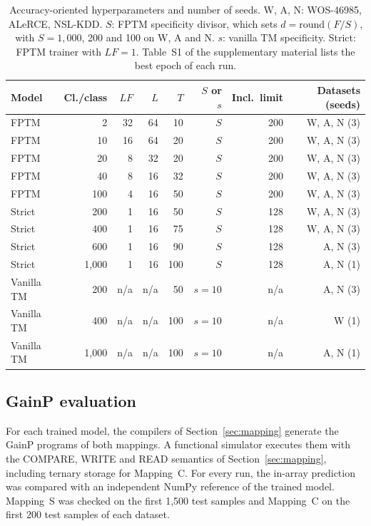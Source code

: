 \documentclass[preprint,review,12pt]{elsarticle}
\newcommand{\gainp}{GainP}
\newcommand{\LF}{\mathit{LF}}
\newcommand{\wosnew}[1]{#1}   %
\begin{document}
\begin{table}[!htbp]
\footnotesize
\setlength{\tabcolsep}{4pt}
\centering
\caption{\wosnew{Accuracy-oriented hyperparameters and number of seeds. W, A, N: WOS-46985, ALeRCE, NSL-KDD. $S$: FPTM specificity divisor, which sets $d=\mathrm{round}(F/S)$, with $S=1{,}000$, 200 and 100 on W, A and N. $s$: vanilla TM specificity. Strict: FPTM trainer with $\LF=1$. Table~S1 of the supplementary material lists the best epoch of each run.}}
\label{tab:hyper}
\begin{tabular}{lrrrrrrr}
\toprule
Model & Cl./class & $\LF$ & $L$ & $T$ & $S$ or $s$ & Incl.\ limit & Datasets (seeds) \\
\midrule
FPTM & 2 & 32 & 64 & 10 & $S$ & 200 & W, A, N (3) \\
FPTM & 10 & 16 & 64 & 20 & $S$ & 200 & W, A, N (3) \\
FPTM & 20 & 8 & 32 & 20 & $S$ & 200 & W, A, N (3) \\
FPTM & 40 & 8 & 16 & 32 & $S$ & 200 & W, A, N (3) \\
FPTM & 100 & 4 & 16 & 50 & $S$ & 200 & W, A, N (3) \\
Strict & 200 & 1 & 16 & 50 & $S$ & 128 & W, A, N (3) \\
Strict & 400 & 1 & 16 & 75 & $S$ & 128 & W, A, N (3) \\
Strict & 600 & 1 & 16 & 90 & $S$ & 128 & A, N (3) \\
Strict & 1,000 & 1 & 16 & 100 & $S$ & 128 & A, N (1) \\
Vanilla TM & 200 & n/a & n/a & 50 & $s=10$ & n/a & A, N (3) \\
Vanilla TM & 400 & n/a & n/a & 100 & $s=10$ & n/a & W (1) \\
Vanilla TM & 1,000 & n/a & n/a & 100 & $s=10$ & n/a & A, N (1) \\
\bottomrule
\end{tabular}
\end{table}

\subsection{\gainp{} evaluation}\label{sec:eval}
For each trained model, the compilers of Section~\ref{sec:mapping} generate the \gainp{} programs of both mappings.
A functional simulator executes them with the COMPARE, WRITE and READ semantics of Section~\ref{sec:mapping}, including ternary storage for Mapping~C.
For every run, the in-array prediction was compared with an independent NumPy reference of the trained model. Mapping~S was checked on the first 1,500 test samples and Mapping~C on the first 200 test samples of each dataset.
\end{document}
